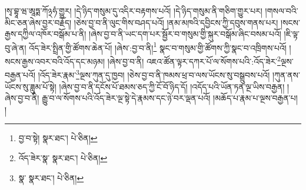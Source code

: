 །སྭ་བྷཱ་ཝ་ཨཱཏྨ་ཀོ྅ཧཾ་གྱུར། །དེ་ཉིད་གསུམ་དུ་འདིར་བརྟགས་པའོ། །དེ་ཉིད་གསུམ་ནི་གཅིག་གྱུར་པར། །གསལ་བའི་མིང་ཅན་ཞེས་བྱར་བརྗོད། །ཅེས་བྱ་བ་ནི་ལུང་གིས་བཤད་པའོ། །ནམ་མཁའི་དབྱིངས་ཀྱི་དབུས་གནས་པར། །སངས་རྒྱས་དཀྱིལ་འཁོར་བསྒོམ་པ་ནི། །ཞེས་བྱ་བ་ནི་ཡང་དག་པར་སྦྱོར་བ་གསུམ་གྱི་སྐུར་བསྒོམ་ཞིང་བསམ་པའོ། །ཇི་ལྟ་བུ་ཞེ་ན། འོད་ཟེར་སྤྲིན་གྱི་ཚོགས་ཆེན་པོ། །ཞེས་:བྱ་བ་ནི།\footnote{བྱ་བ་སྟེ།  སྣར་ཐང་།  པེ་ཅིན། } སྣང་བ་གསུམ་གྱི་ཚོགས་ཀྱི་སྣང་བ་འཁྲིགས་པའོ། །སངས་རྒྱས་འབར་བའི་འོད་དང་མཉམ། །ཞེས་བྱ་བ་ནི། འཇའ་ཚོན་ལྟར་དཀར་པོ་ལ་སོགས་པའི་:འོད་ཟེར་\footnote{འོད་ཟེར་སྣ་  སྣར་ཐང་།  པེ་ཅིན། }ལྔས་བརྒྱན་པའོ། །འོད་ཟེར་རྣམ་\footnote{སྣ་  སྣར་ཐང་།  པེ་ཅིན། }ལྔས་ཀུན་དུ་ཁྱབ། །ཅེས་བྱ་བ་ནི་ཁམས་ཕྲ་བ་ལས་ཡོངས་སུ་བསྒྲུབས་པའོ། །ཀུན་ནས་ཡོངས་སུ་ཟླུམ་པོ་སྟེ། །ཞེས་བྱ་བ་ནི་དངོས་པོ་ཐམས་ཅད་ཀྱི་ངོ་བོ་ཉིད་དོ། །འདོད་པའི་ཡོན་ཏན་ལྔ་ཡིས་བརྒྱན། །ཞེས་བྱ་བ་ནི། རྒྱུ་བ་ལ་སོགས་པའི་འོད་ཟེར་ལྔ་སྟེ་དེ་རྣམས་དང་ཉེ་བར་ལྡན་པའོ། །མཆོད་པ་རྣམ་པ་ལྔས་བརྒྱན་པ། །
